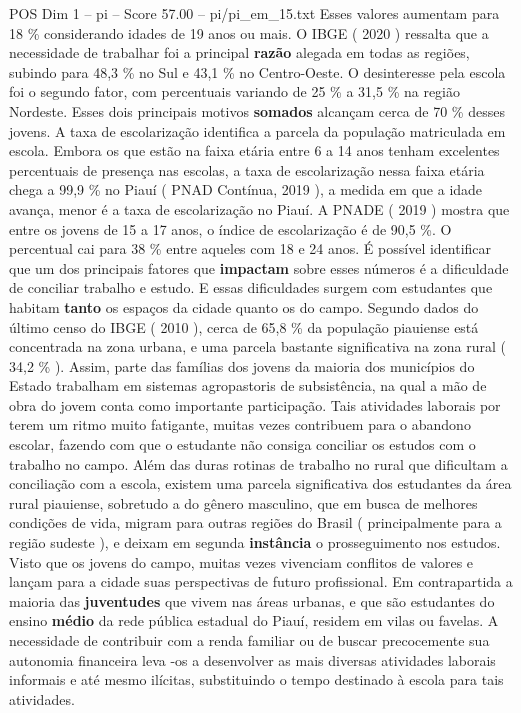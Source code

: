 \begin{textsample}{POS Dim 1 – pi – Score 57.00 – pi/pi\_em\_15.txt}
Esses valores aumentam para 18 \% considerando idades de 19 anos ou mais.
O IBGE ( 2020 ) ressalta que a necessidade de trabalhar foi a principal \textbf{razão} alegada em todas as regiões, subindo para 48,3 \% no Sul e 43,1 \% no Centro-Oeste.
O desinteresse pela escola foi o segundo fator, com percentuais variando de 25 \% a 31,5 \% na região Nordeste.
Esses dois principais motivos \textbf{somados} alcançam cerca de 70 \% desses jovens.
A taxa de escolarização identifica a parcela da população matriculada em escola.
Embora os que estão na faixa etária entre 6 a 14 anos tenham excelentes percentuais de presença nas escolas, a taxa de escolarização nessa faixa etária chega a 99,9 \% no Piauí ( PNAD Contínua, 2019 ), a medida em que a idade avança, menor é a taxa de escolarização no Piauí.
A PNADE ( 2019 ) mostra que entre os jovens de 15 a 17 anos, o índice de escolarização é de 90,5 \%.
O percentual cai para 38 \% entre aqueles com 18 e 24 anos.
É possível identificar que um dos principais fatores que \textbf{impactam} sobre esses números é a dificuldade de conciliar trabalho e estudo.
E essas dificuldades surgem com estudantes que habitam \textbf{tanto} os espaços da cidade quanto os do campo.
Segundo dados do último censo do IBGE ( 2010 ), cerca de 65,8 \% da população piauiense está concentrada na zona urbana, e uma parcela bastante significativa na zona rural ( 34,2 \% ).
Assim, parte das famílias dos jovens da maioria dos municípios do Estado trabalham em sistemas agropastoris de subsistência, na qual a mão de obra do jovem conta como importante participação.
Tais atividades laborais por terem um ritmo muito fatigante, muitas vezes contribuem para o abandono escolar, fazendo com que o estudante não consiga conciliar os estudos com o trabalho no campo.
Além das duras rotinas de trabalho no rural que dificultam a conciliação com a escola, existem uma parcela significativa dos estudantes da área rural piauiense, sobretudo a do gênero masculino, que em busca de melhores condições de vida, migram para outras regiões do Brasil ( principalmente para a região sudeste ), e deixam em segunda \textbf{instância} o prosseguimento nos estudos.
Visto que os jovens do campo, muitas vezes vivenciam conflitos de valores e lançam para a cidade suas perspectivas de futuro profissional.
Em contrapartida a maioria das \textbf{juventudes} que vivem nas áreas urbanas, e que são estudantes do ensino \textbf{médio} da rede pública estadual do Piauí, residem em vilas ou favelas.
A necessidade de contribuir com a renda familiar ou de buscar precocemente sua autonomia financeira leva -os a desenvolver as mais diversas atividades laborais informais e até mesmo ilícitas, substituindo o tempo destinado à escola para tais atividades.

\end{textsample}
